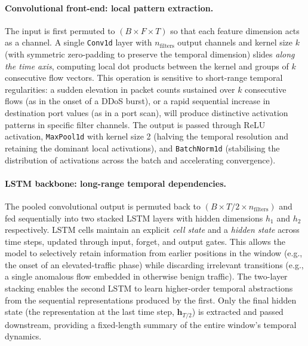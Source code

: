 \documentclass[../main.tex]{subfiles}
\begin{document}
\paragraph{Convolutional front-end: local pattern extraction.}
The input is first permuted to $(B \times F \times T)$ so that each feature dimension acts as a channel.  A single \texttt{Conv1d} layer with $n_{\text{filters}}$ output channels and kernel size $k$ (with symmetric zero-padding to preserve the temporal dimension) slides \emph{along the time axis}, computing local dot products between the kernel and groups of $k$ consecutive flow vectors.  This operation is sensitive to short-range temporal regularities: a sudden elevation in packet counts sustained over $k$ consecutive flows (as in the onset of a DDoS burst), or a rapid sequential increase in destination port values (as in a port scan), will produce distinctive activation patterns in specific filter channels.  The output is passed through ReLU activation, \texttt{MaxPool1d} with kernel size 2 (halving the temporal resolution and retaining the dominant local activations), and \texttt{BatchNorm1d} (stabilising the distribution of activations across the batch and accelerating convergence).

\paragraph{LSTM backbone: long-range temporal dependencies.}
The pooled convolutional output is permuted back to $(B \times T/2 \times n_{\text{filters}})$ and fed sequentially into two stacked LSTM layers with hidden dimensions $h_1$ and $h_2$ respectively.  LSTM cells maintain an explicit \emph{cell state} and a \emph{hidden state} across time steps, updated through input, forget, and output gates.  This allows the model to selectively retain information from earlier positions in the window (e.g., the onset of an elevated-traffic phase) while discarding irrelevant transitions (e.g., a single anomalous flow embedded in otherwise benign traffic).  The two-layer stacking enables the second LSTM to learn higher-order temporal abstractions from the sequential representations produced by the first.  Only the final hidden state (the representation at the last time step, $\mathbf{h}_{T/2}$) is extracted and passed downstream, providing a fixed-length summary of the entire window's temporal dynamics.
\end{document}
